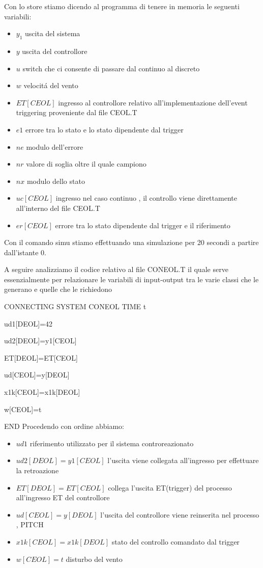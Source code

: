 \documentclass[a4paper,13pt]{article}
\begin{document}
Con lo store stiamo dicendo al programma di tenere in memoria le seguenti variabili:
\begin{itemize}
\item $y_1$      uscita del sistema
\item $y$        uscita del controllore
\item $u$        switch che ci consente di passare dal continuo al discreto
\item $w$        velocit\'a del vento
\item $ET[CEOL]$ ingresso al controllore relativo all'implementazione dell'event triggering proveniente                      dal file CEOL.T
\item $e1$       errore tra lo stato e lo stato dipendente dal trigger
\item $ne$       modulo dell'errore
\item $nr$       valore di soglia oltre il quale campiono
\item $nx$       modulo dello stato
\item $uc[CEOL]$ ingresso nel caso continuo , il controllo viene direttamente all'interno del file CEOL.T
\item $er[CEOL]$ errore tra lo stato dipendente dal trigger e il riferimento  
\end{itemize}

Con il comando simu stiamo effettuando una simulazione per 20 secondi a partire dall'istante 0.

A seguire analizziamo il codice relativo al file CONEOL.T il quale serve essenzialmente per relazionare le variabili di input-output tra le varie classi che le generano e quelle che le richiedono

CONNECTING SYSTEM CONEOL
TIME t

ud1[DEOL]=42 

ud2[DEOL]=y1[CEOL] 

ET[DEOL]=ET[CEOL] 

ud[CEOL]=y[DEOL] 

x1k[CEOL]=x1k[DEOL] 

w[CEOL]=t 

END
Procedendo con ordine abbiamo:
\begin{itemize}
\item $ud1$                 riferimento utilizzato per il sistema controreazionato
\item $ud2[DEOL]=y1[CEOL]$  l'uscita viene collegata all'ingresso per effettuare la retroazione
\item $ET[DEOL]=ET[CEOL]$   collega l'uscita ET(trigger) del processo all'ingresso ET del controllore 
\item $ud[CEOL]=y[DEOL]$    l'uscita del controllore viene reinserita nel processo , PITCH
\item $x1k[CEOL]=x1k[DEOL]$ stato del controllo comandato dal trigger
\item $w[CEOL]=t$           disturbo del vento
\end{itemize}
\end{document}
